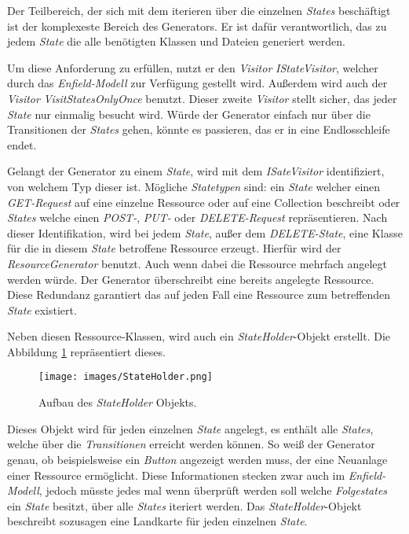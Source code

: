 Der Teilbereich, der sich mit dem iterieren über die einzelnen \textit{States} beschäftigt ist der komplexeste Bereich des Generators. Er ist dafür verantwortlich, das zu jedem \textit{State} die alle benötigten Klassen und Dateien generiert werden. 

Um diese Anforderung zu erfüllen, nutzt er den \textit{Visitor} \textit{IStateVisitor}, welcher durch das \textit{Enfield-Modell} zur Verfügung gestellt wird. Außerdem wird auch der \textit{Visitor} \textit{VisitStatesOnlyOnce} benutzt. Dieser zweite \textit{Visitor} stellt sicher, das jeder \textit{State} nur einmalig besucht wird. Würde der Generator einfach nur über die Transitionen der \textit{States} gehen, könnte es passieren, das er in eine Endlosschleife endet.

Gelangt der Generator zu einem \textit{State}, wird mit dem \textit{ISateVisitor} identifiziert, von welchem Typ dieser ist. Mögliche \textit{Statetypen} sind: ein \textit{State} welcher einen \textit{GET-Request} auf eine einzelne Ressource oder auf eine Collection beschreibt oder \textit{States} welche einen \textit{POST-}, \textit{PUT-} oder \textit{DELETE-Request} repräsentieren.  Nach dieser Identifikation, wird bei jedem \textit{State}, außer dem \textit{DELETE-State}, eine Klasse für die in diesem \textit{State} betroffene Ressource erzeugt. Hierfür wird der \textit{ResourceGenerator} benutzt. Auch wenn dabei die Ressource mehrfach angelegt werden würde. Der Generator überschreibt eine bereits angelegte Ressource. Diese Redundanz garantiert das auf jeden Fall eine Ressource zum betreffenden \textit{State} existiert. 

Neben diesen Ressource-Klassen, wird auch ein \textit{StateHolder}-Objekt erstellt. Die Abbildung \ref{fig:stateHolder} repräsentiert dieses. 

\begin{figure}[H]
	\begin{center}
		\texttt{[image: images/StateHolder.png]}
		\caption{Aufbau des \textit{StateHolder} Objekts.}
		\label{fig:stateHolder}
	\end{center}
\end{figure}

Dieses Objekt wird für jeden einzelnen \textit{State} angelegt, es enthält alle \textit{States}, welche über die \textit{Transitionen} erreicht werden können.
So weiß der Generator genau, ob beispielsweise ein \textit{Button} angezeigt werden muss, der eine Neuanlage einer Ressource ermöglicht. Diese Informationen stecken zwar auch im \textit{Enfield-Modell}, jedoch müsste jedes mal wenn überprüft werden soll welche \textit{Folgestates} ein \textit{State} besitzt, über alle \textit{States} iteriert werden. Das \textit{StateHolder}-Objekt beschreibt sozusagen eine Landkarte für jeden einzelnen \textit{State}.

